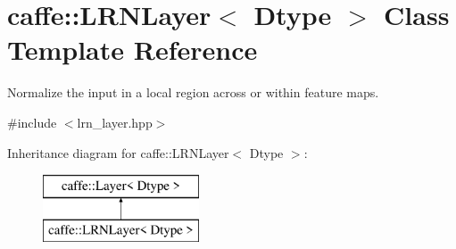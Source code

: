 \hypertarget{classcaffe_1_1LRNLayer}{}\section{caffe\+:\+:L\+R\+N\+Layer$<$ Dtype $>$ Class Template Reference}
\label{classcaffe_1_1LRNLayer}


Normalize the input in a local region across or within feature maps.  




{\ttfamily \#include $<$lrn\+\_\+layer.\+hpp$>$}

Inheritance diagram for caffe\+:\+:L\+R\+N\+Layer$<$ Dtype $>$\+:\begin{figure}[H]
\begin{center}
\leavevmode
\includegraphics[height=2.000000cm]{classcaffe_1_1LRNLayer}
\end{center}
\end{figure}
